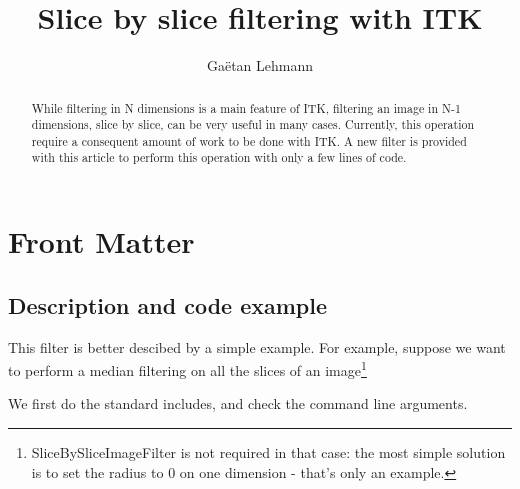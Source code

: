 \documentclass{InsightArticle}
\title{Slice by slice filtering with ITK}
\author{Ga\"etan Lehmann}
\begin{document}
\maketitle

\ifhtml
\chapter*{Front Matter\label{front}}
\fi


\begin{abstract}
\noindent
While filtering in N dimensions is a main feature of ITK, filtering an image
in N-1 dimensions, slice by slice, can be very useful in many cases. Currently,
this operation require a consequent amount of work to be done with ITK. A new
filter is provided with this article to perform this operation with only a few
lines of code.
\end{abstract}



\section{Description and code example}

This filter is better descibed by a simple example. For example, suppose we want to perform
a median filtering on all the slices of an image\footnote{SliceBySliceImageFilter is not required
in that case: the most simple solution is to set the radius to 0 on one dimension - that's only an
example.}

We first do the standard includes, and check the command line arguments.
\end{document}
